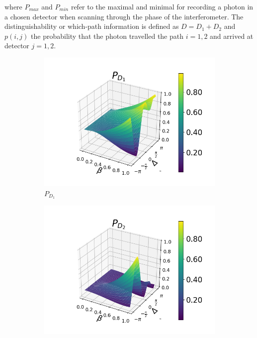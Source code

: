 \documentclass[12pt]{book}
\begin{document}
where $P_{max}$ and $P_{min}$ refer to the maximal and minimal for recording a photon in a chosen detector when scanning through the phase of the interferometer. The distinguishability or which-path information is defined as $D=D_{1}+D_{2}$ and $p(i,j)$ the probability that the photon travelled the path $i=1,2$ and arrived at detector $j=1,2$.



\begin{figure}[H]
\centering
\begin{subfigure}[b]{0.3\linewidth}
\includegraphics[width=\linewidth]{images/pd1_3.png}
\caption{$P_{D_{1}}$}
\end{subfigure}
\begin{subfigure}[b]{0.3\linewidth}
\includegraphics[width=\linewidth]{images/pd2_3.png}

\end{subfigure}
\end{figure}
\end{document}
